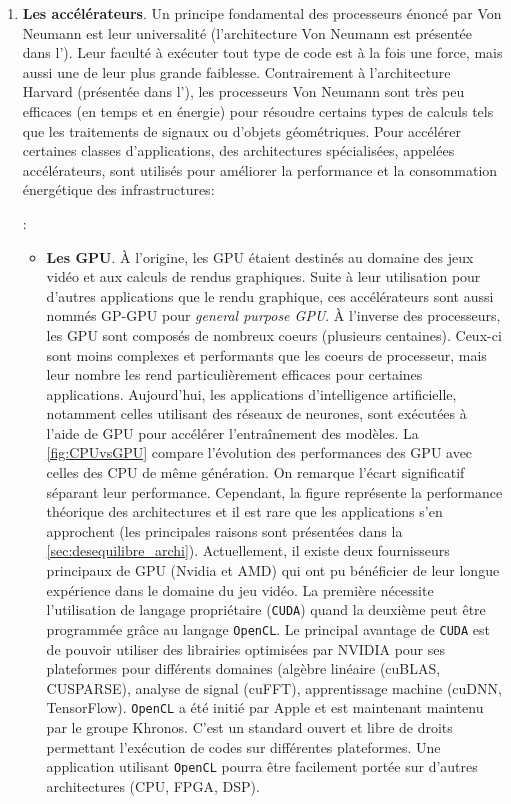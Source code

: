 \begin{enumerate}
            \item \textbf{Les accélérateurs}. Un principe fondamental des processeurs énoncé par Von Neumann est leur universalité (l'architecture Von Neumann est présentée dans l'). Leur faculté à exécuter tout type de code est à la fois une force, mais aussi une de leur plus grande faiblesse. Contrairement à l'architecture Harvard (présentée dans l'), les processeurs Von Neumann sont très peu efficaces (en temps et en énergie) pour résoudre certains types de calculs tels que les traitements de signaux ou d'objets géométriques. Pour accélérer certaines classes d'applications, des architectures spécialisées, appelées accélérateurs, sont utilisés pour améliorer la performance et la consommation énergétique des infrastructures: 
            
            
            :
                \begin{itemize}
    
                    \item\textbf{Les GPU}. À l'origine, les \gls{GPU} étaient destinés au domaine des jeux vidéo et aux calculs de rendus graphiques. Suite à leur utilisation pour d'autres applications que le rendu graphique, ces accélérateurs sont aussi nommés GP-GPU pour \textit{general purpose GPU}. À l'inverse des processeurs, les GPU sont composés de nombreux coeurs (plusieurs centaines). Ceux-ci sont moins complexes et performants que les coeurs de processeur, mais leur nombre les rend particulièrement efficaces pour certaines applications. Aujourd'hui, les applications d'intelligence artificielle, notamment celles utilisant des réseaux de neurones, sont exécutées à l'aide de \gls{GPU} pour accélérer l'entraînement des modèles. La \autoref{fig:CPUvsGPU} compare l'évolution des performances des GPU avec celles des CPU de même génération. On remarque l'écart significatif séparant leur performance. Cependant, la figure représente la performance théorique des architectures et il est rare que les applications s'en approchent (les principales raisons sont présentées dans la \autoref{sec:desequilibre_archi}). 
                    Actuellement, il existe deux fournisseurs principaux de GPU (Nvidia et AMD) qui ont pu bénéficier de leur longue expérience dans le domaine du jeu vidéo. La première nécessite l'utilisation de langage propriétaire (\verb|CUDA|) quand la deuxième peut être programmée grâce au langage \verb|OpenCL|. Le principal avantage de \verb|CUDA| est de pouvoir utiliser des librairies optimisées par NVIDIA pour ses plateformes pour différents domaines (algèbre linéaire (cuBLAS, CUSPARSE), analyse de signal (cuFFT), apprentissage machine (cuDNN, TensorFlow). 
                    \verb|OpenCL| a été initié par Apple et est maintenant maintenu par le groupe Khronos. C'est un standard ouvert et libre de droits permettant l'exécution de codes sur différentes plateformes. Une application utilisant \verb|OpenCL| pourra être facilement portée sur d'autres architectures (CPU, FPGA, DSP). 
                    

\end{itemize}
\end{enumerate}
